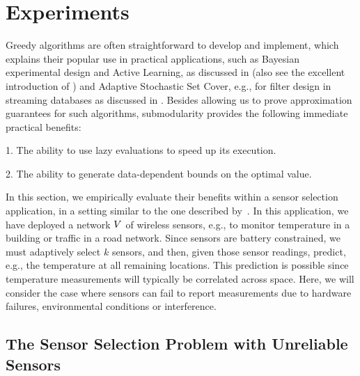 \section{Experiments} \label{sec:experiments}

Greedy algorithms are often straightforward to develop and implement,
which explains their popular use in practical applications, such as
Bayesian experimental design and Active Learning, as discussed in
 (also see the excellent introduction of \citet{nowak09})
and Adaptive Stochastic Set Cover, e.g., for filter design in streaming databases as discussed in .
Besides allowing us to prove approximation guarantees for such algorithms, \term submodularity provides the following immediate practical benefits:
\begin{OneLiners}
\item[1.]  The ability to use lazy evaluations to speed up its execution.
\item [2.] The ability to generate data-dependent bounds on the optimal value. 
\end{OneLiners}
In this section, we empirically evaluate their benefits within a sensor selection application, in a setting similar to the one described by~\citet{vldb04}.  
In this application,  we have deployed a network $V$ of wireless sensors, e.g., to monitor temperature in a building or traffic in a road network. Since sensors are battery constrained, we must adaptively select $k$ sensors, and then, given those sensor readings, predict, e.g., the temperature at all remaining locations.  This prediction is possible since temperature measurements will typically be correlated across space.  Here, we will consider the case where sensors can fail to report measurements due to hardware failures, environmental conditions or interference.


\subsection{The Sensor Selection Problem with Unreliable Sensors}

